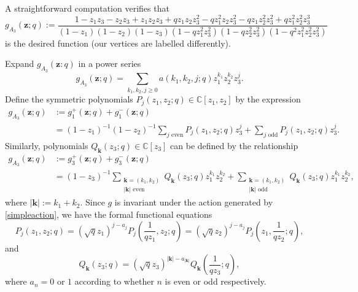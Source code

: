 \documentclass[12pt,reqno]{amsart}
\theoremstyle{plain}
\theoremstyle{remark}
\numberwithin{equation}{section}
\numberwithin{lemma}{section}
\numberwithin{theorem}{section}
\numberwithin{prop}{section}
\numberwithin{remark}{section}
\begin{document}
A straightforward computation verifies that
\begin{equation}
g_{A_3}(\boldsymbol{z};q):=\frac{1-z_1 z_3-z_2 z_3 +z_1 z_2 z_3+q z_1 z_2 z_3^2-qz_1^2 z_2 z_3^2
-q z_1 z_2^2 z_3^2+q z_1^2 z_2^2 z_3^3 }
{(1-z_1)(1-z_2)(1-z_3)(1-q z_1^2 z_3^2)(1-qz_2^2 z_3^2)(1-q^2 z_1^2 z_2^2 z_3^2)} \label{gdef}
\end{equation}
is the desired function \cite[Example~3.7]{CG1} (our vertices are labelled differently).

Expand $g_{A_3}(\boldsymbol{z}:q)$ in a power series 
\begin{equation} \label{powerser}
g_{A_3}(\boldsymbol{z};q)=\sum_{k_1,k_2,j \geq 0} a(k_1,k_2,j;q) z_1^{k_1} z_2^{k_2} z_3^{j}.
\end{equation} 
Define the symmetric polynomials $P_j(z_1,z_2;q) \in \mathbb{C}[z_1,z_2]$ by the expression 
\begin{align} \label{Pjdef}
g_{A_3}(\boldsymbol{z};q)&:=g^{+}_{1}(\boldsymbol{z};q)+g^{-}_{1}(\boldsymbol{z};q) \nonumber \\
&=(1-z_1)^{-1} (1-z_2)^{-1} \sum_{j \text{ even}} P_{j}(z_1,z_2;q) z_3^{j}
+\sum_{j \text{ odd}} P_{j}(z_1,z_2;q) z_3^{j}.
\end{align}
Similarly, polynomials $Q_{\boldsymbol{k}}(z_3;q) \in \mathbb{C}[z_3]$ can be defined by the relationship
\begin{align} \label{Qkdef}
g_{A_3}(\boldsymbol{z};q)&:=g^{+}_{3}(\boldsymbol{z};q)+g^{-}_{3}(\boldsymbol{z};q) \nonumber  \\
&=(1-z_3)^{-1} \sum_{\substack{\boldsymbol{k}=(k_1,k_2)  \\ |\boldsymbol{k}| \text{ even}}} 
Q_{\boldsymbol{k}}(z_3;q) z_1^{k_1} z_2^{k_2}+
\sum_{\substack{\boldsymbol{k}=(k_1,k_2)  \\ |\boldsymbol{k}| \text{ odd}}} Q_{\boldsymbol{k}}(z_3;q) z_1^{k_1} z_2^{k_2},
\end{align}
where $|\boldsymbol{k}|:=k_1+k_2$. Since $g$ is invariant under the action generated by
\eqref{simpleaction}, we have the formal functional equations
\begin{equation}  \label{Pfuncinit}
P_{j}(z_1,z_2;q)=(\sqrt{q} z_1)^{j-a_j} P_j  \left( \frac{1}{qz_1},z_2;q \right)
=(\sqrt{q} z_2)^{j-a_j} P_j \left(z_1,\frac{1}{q z_2};q \right), 
\end{equation}
and 
\begin{equation}
Q_{\boldsymbol{k}}(z_3;q)=(\sqrt{q} z_3)^{|\boldsymbol{k}|-a_{|\boldsymbol{k}|}} 
Q_{\boldsymbol{k}} \left( \frac{1}{qz_3}; q \right), \label{Qfuncinit}
\end{equation}
where $a_n=0$ or $1$ according to whether $n$ is even or odd respectively.  
\end{document}
